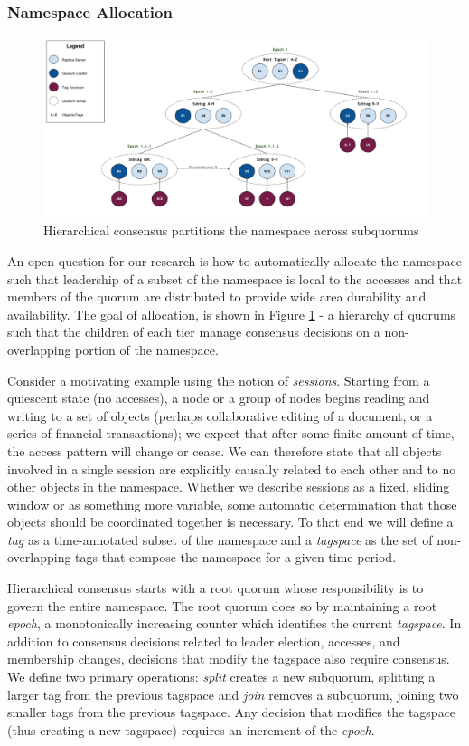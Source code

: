 \documentclass{article}
\begin{document}
\subsubsection{Namespace Allocation}

\begin{figure}
    \centering
        \includegraphics[width=.9\textwidth]{figures/hierarchical}
        \caption{Hierarchical consensus partitions the namespace across subquorums}
        \label{fig:hierarchical}
\end{figure}

An open question for our research is how to automatically allocate the namespace such that leadership of a subset of the namespace is local to the accesses and that members of the quorum are distributed to provide wide area durability and availability. The goal of allocation, is shown in Figure \ref{fig:hierarchical} - a hierarchy of quorums such that the children of each tier manage consensus decisions on a non-overlapping portion of the namespace.

Consider a motivating example using the notion of \textit{sessions}. Starting from a quiescent state (no accesses), a node or a group of nodes begins reading and writing to a set of objects (perhaps collaborative editing of a document, or a series of financial transactions); we expect that after some finite amount of time, the access pattern will change or cease. We can therefore state that all objects involved in a single session are explicitly causally related to each other and to no other objects in the namespace. Whether we describe sessions as a fixed, sliding window or as something more variable, some automatic determination that those objects should be coordinated together is necessary. To that end we will define a \textit{tag} as a time-annotated subset of the namespace and a \textit{tagspace} as the set of non-overlapping tags that compose the namespace for a given time period.

Hierarchical consensus starts with a root quorum whose responsibility is to govern the entire namespace. The root quorum does so by maintaining a root \textit{epoch}, a monotonically increasing counter which identifies the current \textit{tagspace}. In addition to consensus decisions related to leader election, accesses, and membership changes, decisions that modify the tagspace also require consensus. We define two primary operations: \textit{split} creates a new subquorum, splitting a larger tag from the previous tagspace and \textit{join} removes a subquorum, joining two smaller tags from the previous tagspace. Any decision that modifies the tagspace (thus creating a new tagspace) requires an increment of the \textit{epoch}.
\end{document}
